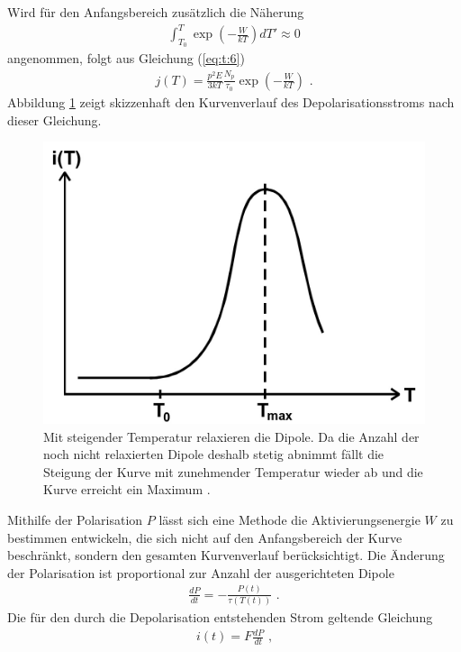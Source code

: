 Wird für den Anfangsbereich zusätzlich die Näherung 
\begin{align}
\int_{T_0}^T\exp\left(-\frac{W}{kT}\right)dT\prime\approx 0	
\label{eq:10}
\end{align}
angenommen, folgt aus Gleichung (\ref{eq:t:6}) 
\begin{align}
j(T)=\frac{p^2E}{3kT}\frac{N_p}{\tau_0}\exp \left(-\frac{W}{kT}\right)\text{ .}
\label{eq:t:11}
\end{align}
Abbildung \ref{fig:t:1} zeigt skizzenhaft den Kurvenverlauf des Depolarisationsstroms nach dieser Gleichung.
\begin{figure}
\centering
\includegraphics[scale=0.5]{content/kurve.jpg}
\caption{Mit steigender Temperatur relaxieren die Dipole. Da die Anzahl der noch nicht relaxierten Dipole deshalb stetig abnimmt fällt die Steigung der Kurve mit zunehmender Temperatur wieder ab und die Kurve erreicht ein Maximum \cite{Anleitung}.}
\label{fig:t:1}
\end{figure}
Mithilfe der Polarisation $P$ lässt sich eine Methode die Aktivierungsenergie $W$ zu bestimmen entwickeln, die sich nicht auf den Anfangsbereich der Kurve beschränkt, sondern den gesamten Kurvenverlauf berücksichtigt.
Die Änderung der Polarisation ist proportional zur Anzahl der ausgerichteten Dipole
\begin{align}
\frac{dP}{dt}=-\frac{P(t)}{\tau(T(t))}\text{ .}
\label{eq:t:12}
\end{align}
Die für den durch die Depolarisation entstehenden Strom geltende Gleichung
\begin{align}
i(t)=F\frac{dP}{dt}\text{ ,}
\label{eq:t:13}
\end{align}
